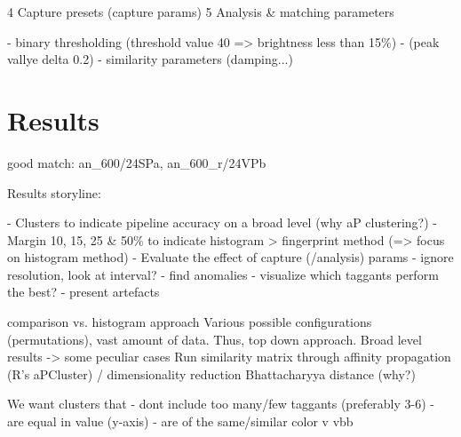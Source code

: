 \documentclass[thesis.tex]{subfiles}
\begin{document}
4 Capture presets (capture params)
5 Analysis \& matching parameters

- binary thresholding (threshold value 40 => brightness less than 15\%)
- (peak vallye delta 0.2)
- similarity parameters (damping...)

\section{Results}
\label{chapter:results}

good match: an\_600/24SPa, an\_600\_r/24VPb

Results storyline:

- Clusters to indicate pipeline accuracy on a broad level (why aP clustering?)
- Margin 10, 15, 25 \& 50\% to indicate histogram > fingerprint method (=> focus on histogram method)
- Evaluate the effect of capture (/analysis) params
  - ignore resolution, look at interval?
  - find anomalies
  - visualize which taggants perform the best?
- present artefacts

comparison vs. histogram approach
Various possible configurations (permutations), vast amount of data. Thus, top down approach. Broad level results -> some peculiar cases
Run similarity matrix through affinity propagation (R's aPCluster) / dimensionality reduction
Bhattacharyya distance (why?)

We want clusters that
- dont include too many/few taggants (preferably 3-6)
- are equal in value (y-axis)
- are of the same/similar color
v vbb
\end{document}
